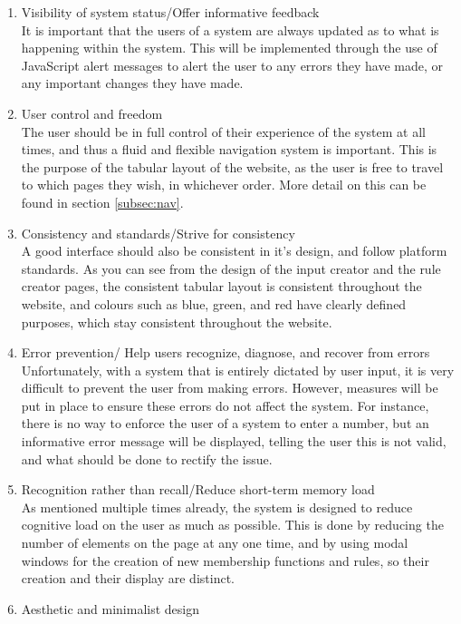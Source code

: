\begin{enumerate}
\item Visibility of system status/Offer informative feedback\\
It is important that the users of a system are always updated as to what is happening within the system. This will be implemented through the use of JavaScript alert messages to alert the user to any errors they have made, or any important changes they have made.
\item User control and freedom\\
The user should be in full control of their experience of the system at all times, and thus a fluid and flexible navigation system is important. This is the purpose of the tabular layout of the website, as the user is free to travel to which pages they wish, in whichever order. More detail on this can be found in section \ref{subsec:nav}.
\item Consistency and standards/Strive for consistency\\
A good interface should also be consistent in it's design, and follow platform standards. As you can see from the design of the input creator and the rule creator pages, the consistent tabular layout is consistent throughout the website, and colours such as blue, green, and red have clearly defined purposes, which stay consistent throughout the website.
\item Error prevention/ Help users recognize, diagnose, and recover from errors\\
Unfortunately, with a system that is entirely dictated by user input, it is very difficult to prevent the user from making errors. However, measures will be put in place to ensure these errors do not affect the system. For instance, there is no way to enforce the user of a system to enter a number, but an informative error message will be displayed, telling the user this is not valid, and what should be done to rectify the issue.
\item Recognition rather than recall/Reduce short-term memory load\\
As mentioned multiple times already, the system is designed to reduce cognitive load on the user as much as possible. This is done by reducing the number of elements on the page at any one time, and by using modal windows for the creation of new membership functions and rules, so their creation and their display are distinct.
\item Aesthetic and minimalist design\\

\end{enumerate}
